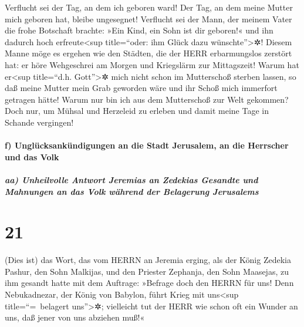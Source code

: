 Verflucht sei der Tag, an dem ich geboren ward! Der Tag,
an dem meine Mutter mich geboren hat, bleibe ungesegnet!
Verflucht sei der Mann, der meinem Vater die frohe
Botschaft brachte: »Ein Kind, ein Sohn ist dir geboren!« und ihn dadurch
hoch erfreute\textless sup title=``oder: ihm Glück dazu
wünschte''\textgreater✲! Diesem Manne möge es ergehen wie
den Städten, die der HERR erbarmungslos zerstört hat: er höre
Wehgeschrei am Morgen und Kriegslärm zur Mittagszeit!
Warum hat er\textless sup title=``d.h.
Gott''\textgreater✲ mich nicht schon im Mutterschoß sterben lassen, so
daß meine Mutter mein Grab geworden wäre und ihr Schoß mich immerfort
getragen hätte! Warum nur bin ich aus dem Mutterschoß zur
Welt gekommen? Doch nur, um Mühsal und Herzeleid zu erleben und damit
meine Tage in Schande vergingen!

\hypertarget{f-ungluxfccksankuxfcndigungen-an-die-stadt-jerusalem-an-die-herrscher-und-das-volk}{%
\paragraph{f) Unglücksankündigungen an die Stadt Jerusalem, an die
Herrscher und das
Volk}\label{f-ungluxfccksankuxfcndigungen-an-die-stadt-jerusalem-an-die-herrscher-und-das-volk}}

\hypertarget{aa-unheilvolle-antwort-jeremias-an-zedekias-gesandte-und-mahnungen-an-das-volk-wuxe4hrend-der-belagerung-jerusalems}{%
\subparagraph{aa) Unheilvolle Antwort Jeremias an Zedekias Gesandte und
Mahnungen an das Volk während der Belagerung
Jerusalems}\label{aa-unheilvolle-antwort-jeremias-an-zedekias-gesandte-und-mahnungen-an-das-volk-wuxe4hrend-der-belagerung-jerusalems}}

\hypertarget{section-20}{%
\section{21}\label{section-20}}

(Dies ist) das Wort, das vom HERRN an Jeremia erging, als
der König Zedekia Pashur, den Sohn Malkijas, und den Priester Zephanja,
den Sohn Maasejas, zu ihm gesandt hatte mit dem Auftrage:
»Befrage doch den HERRN für uns! Denn Nebukadnezar, der
König von Babylon, führt Krieg mit uns\textless sup title=``=~belagert
uns''\textgreater✲; vielleicht tut der HERR wie schon oft ein Wunder an
uns, daß jener von uns abziehen muß!«

